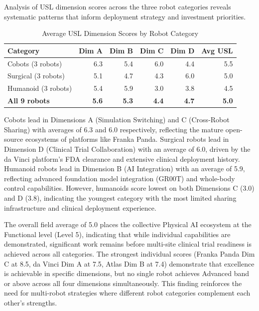 Analysis of USL dimension scores across the three robot categories reveals
systematic patterns that inform deployment strategy and investment priorities.

\clearpage

\begin{table}[H]
\centering
\caption{Average USL Dimension Scores by Robot Category}
\label{tab:dim-averages}
\small
\begin{tabular}{l r r r r r}
\toprule
\textbf{Category} & \textbf{Dim A} & \textbf{Dim B} & \textbf{Dim C} & \textbf{Dim D} & \textbf{Avg USL} \\
\midrule
Cobots (3 robots) & 6.3 & 5.4 & 6.0 & 4.4 & 5.5 \\
Surgical (3 robots) & 5.1 & 4.7 & 4.3 & 6.0 & 5.0 \\
Humanoid (3 robots) & 5.4 & 5.9 & 3.0 & 3.8 & 4.5 \\
\midrule
\textbf{All 9 robots} & \textbf{5.6} & \textbf{5.3} & \textbf{4.4} & \textbf{4.7} & \textbf{5.0} \\
\bottomrule
\end{tabular}
\end{table}

Cobots lead in Dimensions A (Simulation Switching) and C (Cross-Robot Sharing)
with averages of 6.3 and 6.0 respectively, reflecting the mature open-source
ecosystems of platforms like Franka Panda. Surgical robots lead in Dimension D
(Clinical Trial Collaboration) with an average of 6.0, driven by the da Vinci
platform's FDA clearance and extensive clinical deployment history. Humanoid
robots lead in Dimension B (AI Integration) with an average of 5.9, reflecting
advanced foundation model integration (GR00T) and whole-body control
capabilities. However, humanoids score lowest on both Dimensions C (3.0) and D
(3.8), indicating the youngest category with the most limited sharing
infrastructure and clinical deployment experience.

The overall field average of 5.0 places the collective Physical AI ecosystem at
the Functional level (Level 5), indicating that while individual capabilities
are demonstrated, significant work remains before multi-site clinical trial
readiness is achieved across all categories. The strongest individual scores
(Franka Panda Dim C at 8.5, da Vinci Dim A at 7.5, Atlas Dim B at 7.4)
demonstrate that excellence is achievable in specific dimensions, but no single
robot achieves Advanced band or above across all four dimensions
simultaneously. This finding reinforces the need for multi-robot strategies
where different robot categories complement each other's strengths.


